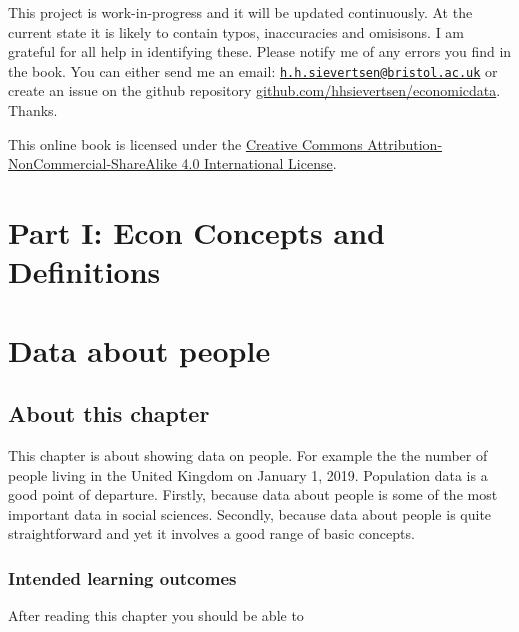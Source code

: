 \documentclass[]{book}
\begin{document}
This project is work-in-progress and it will be updated continuously. At the current state it is likely to contain typos, inaccuracies and omisisons. I am grateful for all help in identifying these. Please notify me of any errors you find in the book. You can either send me an email: \href{mailto:h.h.sievertsen@bristol.ac.uk}{\nolinkurl{h.h.sievertsen@bristol.ac.uk}} or create an issue on the github repository \href{https://github.com/hhsievertsen/economicdata}{github.com/hhsievertsen/economicdata}. Thanks.

This online book is licensed under the \href{http://creativecommons.org/licenses/by-nc-sa/4.0/}{Creative Commons Attribution-NonCommercial-ShareAlike 4.0 International License}.

\hypertarget{part-i-econ-concepts-and-definitions}{%
\chapter*{Part I: Econ Concepts and Definitions}\label{part-i-econ-concepts-and-definitions}}

\hypertarget{people}{%
\chapter{Data about people}\label{people}}

\hypertarget{about-this-chapter}{%
\section{About this chapter}\label{about-this-chapter}}

This chapter is about showing data on people. For example the the number of people living in the United Kingdom on January 1, 2019. Population data is a good point of departure. Firstly, because data about people is some of the most important data in social sciences. Secondly, because data about people is quite straightforward and yet it involves a good range of basic concepts.

\hypertarget{intended-learning-outcomes}{%
\subsection{Intended learning outcomes}\label{intended-learning-outcomes}}

After reading this chapter you should be able to
\end{document}
